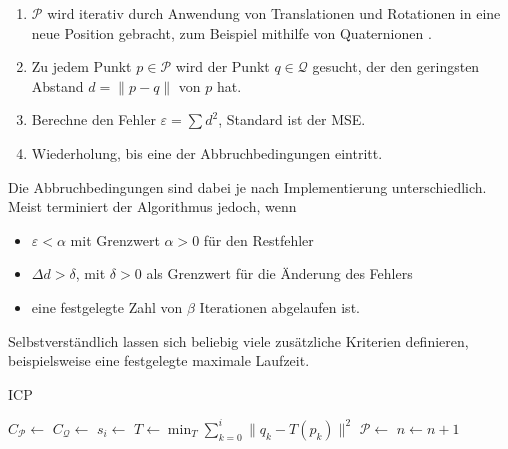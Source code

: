 \begin{enumerate}
\item $\mathcal{P}$ wird iterativ durch Anwendung von Translationen und Rotationen in eine neue Position gebracht, zum Beispiel mithilfe von Quaternionen \cite{horn1987closed}.
\item Zu jedem Punkt $p \in \mathcal{P}$ wird der Punkt $q \in \mathcal{Q}$ gesucht, der den geringsten Abstand $d = \|p - q\|$ von $p$ hat.
\item Berechne den Fehler $\varepsilon = \sum d^2$, Standard ist der \ac{MSE}.
\item Wiederholung, bis eine der Abbruchbedingungen eintritt.
\end{enumerate}

Die Abbruchbedingungen sind dabei je nach Implementierung unterschiedlich.
Meist terminiert der Algorithmus jedoch, wenn

\begin{itemize}
\item $\varepsilon < \alpha$ mit Grenzwert $\alpha > 0$ für den Restfehler
\item $\Delta d > \delta$, mit $\delta > 0$ als Grenzwert für die Änderung des Fehlers
\item eine festgelegte Zahl von $\beta$ Iterationen abgelaufen ist.
\end{itemize}

Selbstverständlich lassen sich beliebig viele zusätzliche Kriterien definieren, beispielsweise eine festgelegte maximale Laufzeit.


\begin{algorithm}[ht]
\caption[\acl{ICP}]{\acl{ICP} \cite[56]{elkhrachy2008phdthesis}}
\label{alg:icp}
\begin{algorithmic}
\State $C_\mathcal{P} \gets$ 
\State $C_\mathcal{Q} \gets$ 
\State {}
		\State $s_i \gets$ 
	\EndFor
	\State $T \gets \min_T \sum\limits_{k=0}^{i} \|q_k - T(p_k)\|^2$
	\State $\mathcal{P} \gets$ 
	\State $n \gets n + 1$
\EndWhile
\end{algorithmic}
\end{algorithm}


